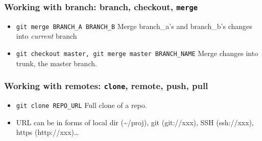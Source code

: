 \documentclass[11pt,ignorenonframetext,]{beamer}
\begin{document}
\begin{frame}[fragile]\frametitle{Working with \textbf{branch}: branch,
checkout, \texttt{merge}}

\begin{itemize}
\item
  \texttt{git merge BRANCH\_A BRANCH\_B} Merge branch\_a's and
  branch\_b's changes into \emph{current} branch
\item
  \texttt{git checkout master, git merge master BRANCH\_NAME} Merge
  changes into trunk, the master branch.
\end{itemize}
\end{frame}

\begin{frame}[fragile, label=gitremote]\frametitle{Working with \textbf{remotes}:
\texttt{clone}, remote, push, pull}

\begin{itemize}
\item
  \texttt{git clone REPO\_URL} Full clone of a repo.
\item
  URL can be in forms of local dir (\textasciitilde{}/proj), git
  (git://xxx), SSH (ssh://xxx), https (http://xxx)\ldots{}
\end{itemize}
\end{frame}
\end{document}
